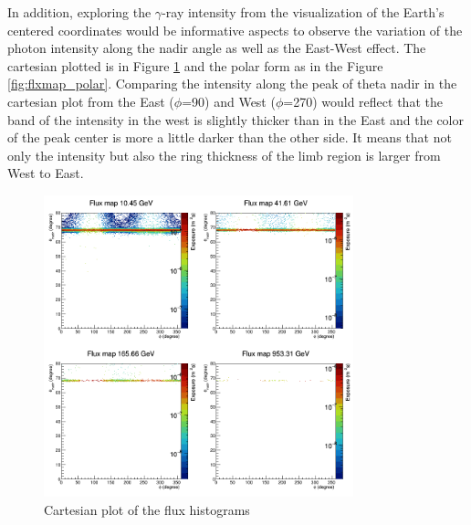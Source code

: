 \newpage

In addition, exploring the $\gamma$-ray intensity from the visualization
of the Earth's centered coordinates would be informative aspects
to observe the variation of the photon intensity along the nadir angle as well as the 
East-West effect. The cartesian plotted is in Figure
\ref{fig:flxmap_cartesian} and the polar form as in the Figure 
\ref{fig:flxmap_polar}. Comparing the intensity along the peak of 
theta nadir in the cartesian plot from the East ($\phi$=90\textdegree)
and West ($\phi$=270\textdegree) would reflect that the band of 
the intensity in the west is slightly thicker than in the East and the 
color of the peak center is more a little darker than the other 
side. It means that not only the intensity but also the ring thickness
of the limb region is larger from West to East.


\begin{figure}[h!]
    \centering
    \includegraphics[width=0.8\textwidth]{content/result_and_discussion/figures/cartesian_flxmaps.png}
    \caption{Cartesian plot of the flux histograms}
    \label{fig:flxmap_cartesian}
\end{figure}


